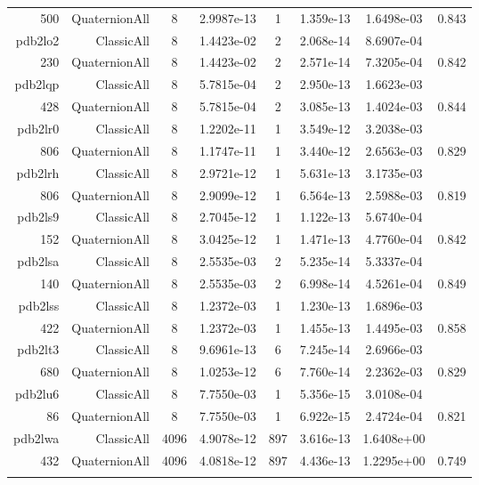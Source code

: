 \begin{xltabular}{\textwidth}{r|rcS[table-format=1.4e+2]cS[table-format=1.3e+2]S[table-format=1.4e+2]S[table-format=-1.3]}
500 & QuaternionAll & 8 & 2.9987e-13 & 1 & 1.359e-13 & 1.6498e-03 & 0.843\\  \addlinespace
pdb2lo2 & ClassicAll & 8 & 1.4423e-02 & 2 & 2.068e-14 & 8.6907e-04 & \\
230 & QuaternionAll & 8 & 1.4423e-02 & 2 & 2.571e-14 & 7.3205e-04 & 0.842\\  \addlinespace
pdb2lqp & ClassicAll & 8 & 5.7815e-04 & 2 & 2.950e-13 & 1.6623e-03 & \\
428 & QuaternionAll & 8 & 5.7815e-04 & 2 & 3.085e-13 & 1.4024e-03 & 0.844\\  \addlinespace
pdb2lr0 & ClassicAll & 8 & 1.2202e-11 & 1 & 3.549e-12 & 3.2038e-03 & \\
806 & QuaternionAll & 8 & 1.1747e-11 & 1 & 3.440e-12 & 2.6563e-03 & 0.829\\  \addlinespace
pdb2lrh & ClassicAll & 8 & 2.9721e-12 & 1 & 5.631e-13 & 3.1735e-03 & \\
806 & QuaternionAll & 8 & 2.9099e-12 & 1 & 6.564e-13 & 2.5988e-03 & 0.819\\  \addlinespace
pdb2ls9 & ClassicAll & 8 & 2.7045e-12 & 1 & 1.122e-13 & 5.6740e-04 & \\
152 & QuaternionAll & 8 & 3.0425e-12 & 1 & 1.471e-13 & 4.7760e-04 & 0.842\\  \addlinespace
pdb2lsa & ClassicAll & 8 & 2.5535e-03 & 2 & 5.235e-14 & 5.3337e-04 & \\
140 & QuaternionAll & 8 & 2.5535e-03 & 2 & 6.998e-14 & 4.5261e-04 & 0.849\\  \addlinespace
pdb2lss & ClassicAll & 8 & 1.2372e-03 & 1 & 1.230e-13 & 1.6896e-03 & \\
422 & QuaternionAll & 8 & 1.2372e-03 & 1 & 1.455e-13 & 1.4495e-03 & 0.858\\  \addlinespace
pdb2lt3 & ClassicAll & 8 & 9.6961e-13 & 6 & 7.245e-14 & 2.6966e-03 & \\
680 & QuaternionAll & 8 & 1.0253e-12 & 6 & 7.760e-14 & 2.2362e-03 & 0.829\\  \addlinespace
pdb2lu6 & ClassicAll & 8 & 7.7550e-03 & 1 & 5.356e-15 & 3.0108e-04 & \\
86 & QuaternionAll & 8 & 7.7550e-03 & 1 & 6.922e-15 & 2.4724e-04 & 0.821\\  \addlinespace
{\color{red} pdb2lwa } & ClassicAll & 4096 & 4.9078e-12 & 897 & 3.616e-13 & 1.6408e+00 & \\
432 & QuaternionAll & 4096 & 4.0818e-12 & 897 & 4.436e-13 & 1.2295e+00 & 0.749\\  \addlinespace

\end{xltabular}
